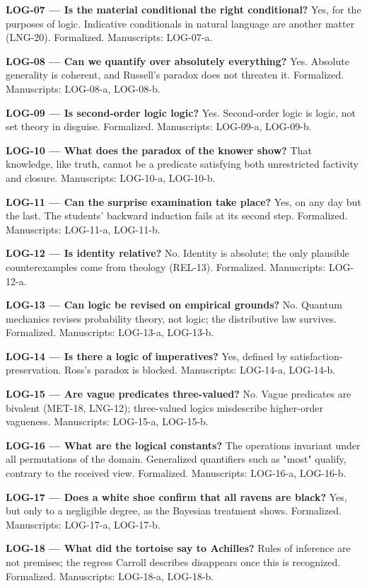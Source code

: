 \documentclass[10pt]{article}
\begin{document}
\textbf{LOG-07 --- Is the material conditional the right conditional?} Yes, for the purposes of logic. Indicative conditionals in natural language are another matter (LNG-20). Formalized. Manuscripts: LOG-07-a.

\textbf{LOG-08 --- Can we quantify over absolutely everything?} Yes. Absolute generality is coherent, and Russell's paradox does not threaten it. Formalized. Manuscripts: LOG-08-a, LOG-08-b.

\textbf{LOG-09 --- Is second-order logic logic?} Yes. Second-order logic is logic, not set theory in disguise. Formalized. Manuscripts: LOG-09-a, LOG-09-b.

\textbf{LOG-10 --- What does the paradox of the knower show?} That knowledge, like truth, cannot be a predicate satisfying both unrestricted factivity and closure. Manuscripts: LOG-10-a, LOG-10-b.

\textbf{LOG-11 --- Can the surprise examination take place?} Yes, on any day but the last. The students' backward induction fails at its second step. Formalized. Manuscripts: LOG-11-a, LOG-11-b.

\textbf{LOG-12 --- Is identity relative?} No. Identity is absolute; the only plausible counterexamples come from theology (REL-13). Formalized. Manuscripts: LOG-12-a.

\textbf{LOG-13 --- Can logic be revised on empirical grounds?} No. Quantum mechanics revises probability theory, not logic; the distributive law survives. Formalized. Manuscripts: LOG-13-a, LOG-13-b.

\textbf{LOG-14 --- Is there a logic of imperatives?} Yes, defined by satisfaction-preservation. Ross's paradox is blocked. Manuscripts: LOG-14-a, LOG-14-b.

\textbf{LOG-15 --- Are vague predicates three-valued?} No. Vague predicates are bivalent (MET-18, LNG-12); three-valued logics misdescribe higher-order vagueness. Manuscripts: LOG-15-a, LOG-15-b.

\textbf{LOG-16 --- What are the logical constants?} The operations invariant under all permutations of the domain. Generalized quantifiers such as "most" qualify, contrary to the received view. Formalized. Manuscripts: LOG-16-a, LOG-16-b.

\textbf{LOG-17 --- Does a white shoe confirm that all ravens are black?} Yes, but only to a negligible degree, as the Bayesian treatment shows. Formalized. Manuscripts: LOG-17-a, LOG-17-b.

\textbf{LOG-18 --- What did the tortoise say to Achilles?} Rules of inference are not premises; the regress Carroll describes disappears once this is recognized. Formalized. Manuscripts: LOG-18-a, LOG-18-b.
\end{document}
